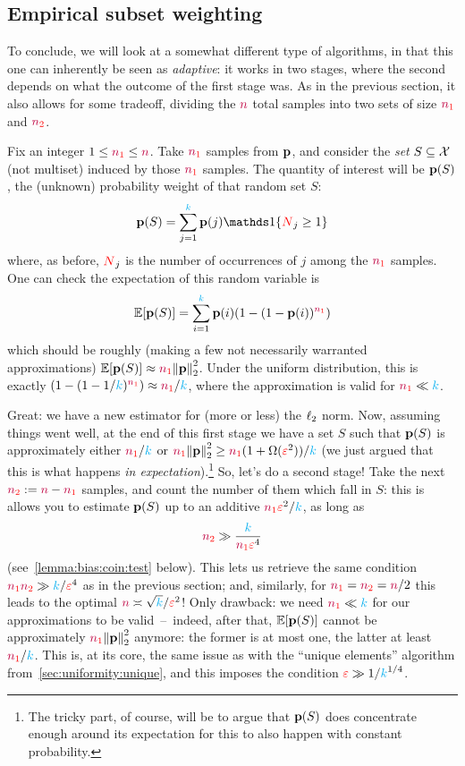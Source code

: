 \subsection{Empirical subset weighting} 
	\label{ssec:empirical:subset}
To conclude, we will look at a somewhat different type of algorithms, in that this one can inherently be seen as \emph{adaptive}: it works in two stages, where the second depends on what the outcome of the first stage was. As in the previous section, it also allows for some tradeoff, dividing the $\ns$ total samples into two sets of size $\nss$ and $\nst$.


Fix an integer $1\leq \nss \leq \ns$. Take $\nss$ \iid samples from $\p$, and consider the \emph{set} $S\subseteq\domain$ (not multiset) induced by those $\nss$ samples. The quantity of interest will be $\p(S)$, the (unknown) probability weight of that random set $S$:
\begin{equation}
    \p(S) = \sum_{j=1}^\ab \p(j) \indic{\occur_j \geq 1}
\end{equation}
where, as before, $\occur_j$ is the number of occurrences of $j$ among the $\nss$ samples. One can check the expectation of this random variable is
\begin{equation}
  \label{eq:expect:empirical:weight}
    \expect{\p(S)} = \sum_{i=1}^\ab \p(i) (1-(1-\p(i))^{\nss})
\end{equation}
which should be roughly (making a few not necessarily warranted approximations) $\expect{\p(S)}\approx \nss\normtwo{\p}^2$. Under the uniform distribution, this is exactly $(1-(1-1/\ab)^{\nss})\approx \nss/\ab$, where the approximation is valid for $\nss\ll \ab$.

Great: we have a new estimator for (more or less) the $\lp[2]$ norm. Now, assuming things went well, at the end of this first stage we have a set $S$ such that $\p(S)$ is approximately either $\nss/\ab$ or $\nss\normtwo{\p}^2\geq \nss(1+\Omega(\dst^2))/\ab$ (we just argued that this is what happens \emph{in expectation}).\footnote{The tricky part, of course, will be to argue that $\p(S)$ does concentrate enough around its expectation for this to also happen with constant probability.} So, let's do a second stage! Take the next $\nst \eqdef \ns-\nss$ samples, and count the number of them which fall in $S$: this is allows you to estimate $\p(S)$  up to an additive $\nss\dst^2/\ab$, as long as
\[
      \nst \gg \frac{\ab}{\nss\dst^4}
\]
(see~\cref{lemma:bias:coin:test} below). This lets us retrieve the same condition $\nss\nst\gg \ab/\dst^4$ as in the previous section; and, similarly, for $\nss=\nst=\ns/2$ this leads to the optimal $\ns \asymp \sqrt{\ab}/\dst^2$! Only drawback: we need $\nss\ll \ab$ for our approximations to be valid~--~indeed, after that, $\expect{\p(S)}$ cannot be approximately $\nss\normtwo{\p}^2$ anymore: the former is at most one, the latter at least $\nss/\ab$. This is, at its core, the same issue as with the ``unique elements'' algorithm from~\cref{sec:uniformity:unique}, and this imposes the condition $\dst \gg 1/\ab^{1/4}$.

